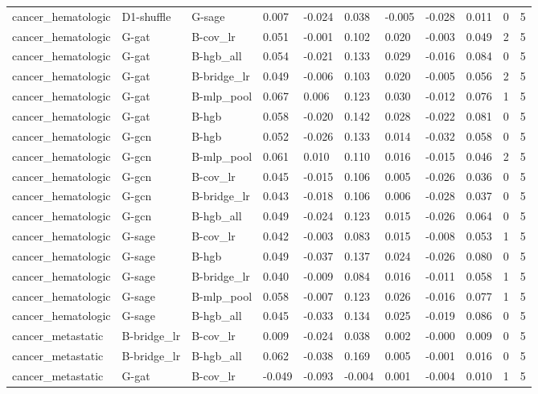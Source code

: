 \begin{table}[t]
\begin{tabular}{lllllllllll}
cancer\_hematologic & D1-shuffle & G-sage & 0.007 & -0.024 & 0.038 & -0.005 & -0.028 & 0.011 & 0 & 5 \\
cancer\_hematologic & G-gat & B-cov\_lr & 0.051 & -0.001 & 0.102 & 0.020 & -0.003 & 0.049 & 2 & 5 \\
cancer\_hematologic & G-gat & B-hgb\_all & 0.054 & -0.021 & 0.133 & 0.029 & -0.016 & 0.084 & 0 & 5 \\
cancer\_hematologic & G-gat & B-bridge\_lr & 0.049 & -0.006 & 0.103 & 0.020 & -0.005 & 0.056 & 2 & 5 \\
cancer\_hematologic & G-gat & B-mlp\_pool & 0.067 & 0.006 & 0.123 & 0.030 & -0.012 & 0.076 & 1 & 5 \\
cancer\_hematologic & G-gat & B-hgb & 0.058 & -0.020 & 0.142 & 0.028 & -0.022 & 0.081 & 0 & 5 \\
cancer\_hematologic & G-gcn & B-hgb & 0.052 & -0.026 & 0.133 & 0.014 & -0.032 & 0.058 & 0 & 5 \\
cancer\_hematologic & G-gcn & B-mlp\_pool & 0.061 & 0.010 & 0.110 & 0.016 & -0.015 & 0.046 & 2 & 5 \\
cancer\_hematologic & G-gcn & B-cov\_lr & 0.045 & -0.015 & 0.106 & 0.005 & -0.026 & 0.036 & 0 & 5 \\
cancer\_hematologic & G-gcn & B-bridge\_lr & 0.043 & -0.018 & 0.106 & 0.006 & -0.028 & 0.037 & 0 & 5 \\
cancer\_hematologic & G-gcn & B-hgb\_all & 0.049 & -0.024 & 0.123 & 0.015 & -0.026 & 0.064 & 0 & 5 \\
cancer\_hematologic & G-sage & B-cov\_lr & 0.042 & -0.003 & 0.083 & 0.015 & -0.008 & 0.053 & 1 & 5 \\
cancer\_hematologic & G-sage & B-hgb & 0.049 & -0.037 & 0.137 & 0.024 & -0.026 & 0.080 & 0 & 5 \\
cancer\_hematologic & G-sage & B-bridge\_lr & 0.040 & -0.009 & 0.084 & 0.016 & -0.011 & 0.058 & 1 & 5 \\
cancer\_hematologic & G-sage & B-mlp\_pool & 0.058 & -0.007 & 0.123 & 0.026 & -0.016 & 0.077 & 1 & 5 \\
cancer\_hematologic & G-sage & B-hgb\_all & 0.045 & -0.033 & 0.134 & 0.025 & -0.019 & 0.086 & 0 & 5 \\
cancer\_metastatic & B-bridge\_lr & B-cov\_lr & 0.009 & -0.024 & 0.038 & 0.002 & -0.000 & 0.009 & 0 & 5 \\
cancer\_metastatic & B-bridge\_lr & B-hgb\_all & 0.062 & -0.038 & 0.169 & 0.005 & -0.001 & 0.016 & 0 & 5 \\
cancer\_metastatic & G-gat & B-cov\_lr & -0.049 & -0.093 & -0.004 & 0.001 & -0.004 & 0.010 & 1 & 5 \\

\end{tabular}
\end{table}
